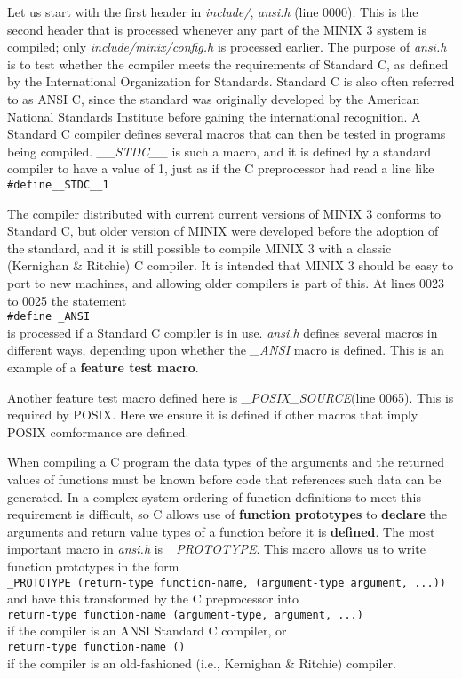 \documentclass{book}
\newcommand {\kw}  [1] {\textbf{#1}}
\newcommand {\sys} [1] {\textsl{#1}}
\newcommand {\cmd} [1] {\texttt{#1}}
\begin{document}
Let us start with the first header in \sys{include/}, \sys{ansi.h} (line 0000).
This is the second header that is processed whenever any part of the MINIX 3 system is compiled;
only \sys{include/minix/config.h} is processed earlier.
The purpose of \sys{ansi.h} is to test whether the compiler meets the requirements of Standard C,
as defined by the International Organization for Standards.
Standard C is also often referred to as ANSI C,
since the standard was originally developed by the American National Standards Institute before gaining the international recognition.
A Standard C compiler defines several macros that can then be tested in programs being compiled.
\sys{\_\_STDC\_\_} is such a macro, and it is defined by a standard compiler to have a value of 1, 
just as if the C preprocessor had read a line like\\
\cmd{\#define\_\_STDC\_\_1}

The compiler distributed with current current versions of MINIX 3 conforms to Standard C,
but older version of MINIX were developed before the adoption of the standard,
and it is still possible to compile MINIX 3 with a classic (Kernighan \& Ritchie) C compiler.
It is intended that MINIX 3 should be easy to port to new machines,
and allowing older compilers is part of this.
At lines 0023 to 0025 the statement\\
\cmd{\#define \_ANSI}\\
is processed if a Standard C compiler is in use.
\sys{ansi.h} defines several macros in different ways,
depending upon whether the \sys{\_ANSI} macro is defined.
This is an example of a \kw{feature test macro}.

Another feature test macro defined here is \sys{\_POSIX\_SOURCE}(line 0065).
This is required by POSIX.
Here we ensure it is defined if other macros that imply POSIX comformance are defined.

When compiling a C program the data types of the arguments and the returned values of functions must be known before code 
that references such data can be generated.
In a complex system ordering of function definitions to meet this requirement is difficult,
so C allows use of \kw{function prototypes} to \kw{declare} the arguments and return value types of a function before it is \kw{defined}.
The most important macro in \sys{ansi.h} is \sys{\_PROTOTYPE}.
This macro allows us to write function prototypes in the form\\
\cmd{\_PROTOTYPE (return-type function-name, (argument-type argument, ...))}\\
and have this transformed by the C preprocessor into\\
\cmd{return-type function-name (argument-type, argument, ...)}\\
if the compiler is an ANSI Standard C compiler, or\\
\cmd{return-type function-name ()}\\
if the compiler is an old-fashioned (i.e., Kernighan \& Ritchie) compiler.
\end{document}
